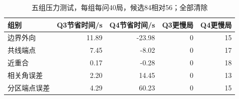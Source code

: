 ﻿\begin{table}[!htbp]\centering\small\caption{五组压力测试，每组每问40局，候选84相对56；全部清除}\label{tab:stress}\begin{tabular}{lrrrr}\toprule 组别&Q3节省时间/s&Q4节省时间/s&Q3更慢局&Q4更慢局\\\midrule
边界外向&11.89&-23.98&0&15\\
共线端点&7.45&-8.02&0&17\\
近重合&0.17&-0.28&0&18\\
相关角误差&2.20&14.45&0&13\\
分区端点误差&4.29&60.23&0&15\\
\bottomrule\end{tabular}\end{table}